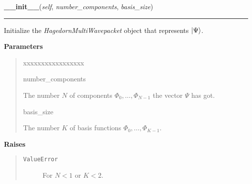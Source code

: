 \hspace{.8\funcindent}\begin{boxedminipage}{\funcwidth}

    \raggedright \textbf{\_\_init\_\_}(\textit{self}, \textit{number\_components}, \textit{basis\_size})

    \vspace{-1.5ex}

    \rule{\textwidth}{0.5\fboxrule}
\setlength{\parskip}{2ex}
    Initialize the \textit{HagedornMultiWavepacket} object that represents
    $\Ket{\Psi}$.

\setlength{\parskip}{1ex}
      \textbf{Parameters}
      \vspace{-1ex}

      \begin{quote}
        \begin{Ventry}{xxxxxxxxxxxxxxxxx}

          \item[number\_components]

          The number $N$ of components $\Phi_0,
          \ldots , \Phi_{N-1}$ the vector
          $\Psi$ has got.

          \item[basis\_size]

          The number $K$ of basis functions $\Phi_0,
          \ldots , \Phi_{K-1}$.

        \end{Ventry}

      \end{quote}

      \textbf{Raises}
    \vspace{-1ex}

      \begin{quote}
        \begin{description}

          \item[\texttt{ValueError}]

          For $N < 1$ or $K < 2$.

        \end{description}

      \end{quote}

    \end{boxedminipage}

    \label{HagedornMultiWavepacket:HagedornMultiWavepacket:__str__}

